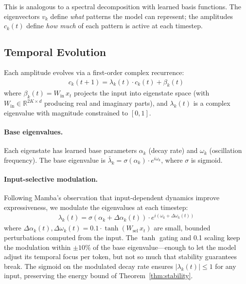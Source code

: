 \documentclass{article}
\begin{document}
This is analogous to a spectral decomposition with learned basis functions. The eigenvectors $v_k$ define \emph{what} patterns the model can represent; the amplitudes $c_k(t)$ define \emph{how much} of each pattern is active at each timestep.

\subsection{Temporal Evolution}

Each amplitude evolves via a first-order complex recurrence:
\begin{align}
c_k(t+1) = \lambda_k(t) \cdot c_k(t) + \beta_k(t) \label{eq:evolution}
\end{align}
where $\beta_k(t) = W_{\text{in}} \, x_t$ projects the input into eigenstate space (with $W_{\text{in}} \in \mathbb{R}^{2K \times d}$ producing real and imaginary parts), and $\lambda_k(t)$ is a complex eigenvalue with magnitude constrained to $[0, 1]$.

\paragraph{Base eigenvalues.} Each eigenstate has learned base parameters $\alpha_k$ (decay rate) and $\omega_k$ (oscillation frequency). The base eigenvalue is $\bar{\lambda}_k = \sigma(\alpha_k) \cdot e^{i\omega_k}$, where $\sigma$ is sigmoid.

\paragraph{Input-selective modulation.} Following Mamba's observation that input-dependent dynamics improve expressiveness, we modulate the eigenvalues at each timestep:
\begin{align}
\lambda_k(t) = \sigma\!\left(\alpha_k + \Delta\alpha_k(t)\right) \cdot e^{i(\omega_k + \Delta\omega_k(t))} \label{eq:selective}
\end{align}
where $\Delta\alpha_k(t), \Delta\omega_k(t) = 0.1 \cdot \tanh(W_{\text{sel}} \, x_t)$ are small, bounded perturbations computed from the input. The $\tanh$ gating and 0.1 scaling keep the modulation within $\pm 10\%$ of the base eigenvalue---enough to let the model adjust its temporal focus per token, but not so much that stability guarantees break. The sigmoid on the modulated decay rate ensures $|\lambda_k(t)| \leq 1$ for any input, preserving the energy bound of Theorem~\ref{thm:stability}.
\end{document}
